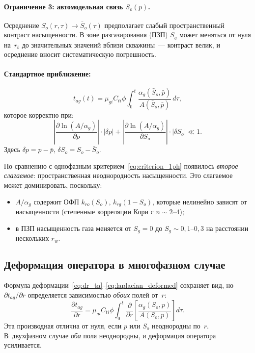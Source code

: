 \documentclass[12pt,a4paper]{article}
\begin{document}
\paragraph{Ограничение 3: автомодельная связь $S_o(p)$.}
Осреднение $S_o(r,\tau) \to \bar{S}_o(\tau)$ предполагает
слабый пространственный контраст насыщенности.
В зоне разгазирования (ПЗП) $S_g$ может меняться
от нуля на~$r_b$ до значительных значений вблизи
скважины~--- контраст велик, и осреднение вносит
систематическую погрешность.

\paragraph{Стандартное приближение:}
\begin{equation}\label{eq:tag_std}
  t_{ag}(t) = \mu_{gi}C_{ti}\phi\int_0^t
  \frac{\alpha_g(\bar{S}_o,\bar{p})}
       {A(\bar{S}_o,\bar{p})}\,d\tau,
\end{equation}
которое корректно при:
\begin{equation}\label{eq:criterion_multi}
  \boxed{
  \left|\frac{\partial\ln(A/\alpha_g)}{\partial p}\right|
  \cdot |\delta p|
  + \left|\frac{\partial\ln(A/\alpha_g)}{\partial S_o}\right|
  \cdot |\delta S_o| \ll 1.}
\end{equation}
Здесь $\delta p = p - \bar{p}$, $\delta S_o = S_o - \bar{S}_o$.

По сравнению с однофазным критерием~\eqref{eq:criterion_1ph}
появилось \emph{второе слагаемое}: пространственная
неоднородность насыщенности. Это слагаемое может
доминировать, поскольку:
\begin{itemize}[nosep]
  \item $A/\alpha_g$ содержит ОФП $k_{ro}(S_o)$, $k_{rg}(1-S_o)$,
        которые нелинейно зависят от насыщенности
        (степенные корреляции Кори с $n \sim 2$--$4$);
  \item в ПЗП насыщенность газа меняется от $S_g = 0$
        до $S_g \sim 0{,}1$--$0{,}3$ на расстоянии
        нескольких $r_w$.
\end{itemize}

\subsection{Деформация оператора в многофазном случае}

Формула деформации~\eqref{eq:dr_ta}--\eqref{eq:laplacian_deformed}
сохраняет вид, но $\partial t_{ag}/\partial r$ определяется
зависимостью \emph{обоих} полей от~$r$:
\begin{equation}\label{eq:dtag_dr}
  \frac{\partial t_{ag}}{\partial r}
  = \mu_{gi}C_{ti}\phi\int_0^t
  \frac{\partial}{\partial r}
  \!\left[\frac{\alpha_g(S_o,p)}{A(S_o,p)}\right] d\tau.
\end{equation}
Эта производная отлична от нуля, если $p$ или $S_o$
неоднородны по~$r$. В~двухфазном случае \emph{оба} поля
неоднородны, и деформация оператора усиливается.
\end{document}

